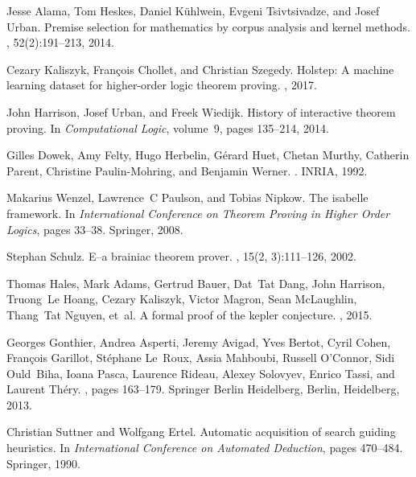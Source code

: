 \documentclass{article}
\begin{document}
\begin{thebibliography}{10}
Jesse Alama, Tom Heskes, Daniel K{\"u}hlwein, Evgeni Tsivtsivadze, and Josef
  Urban.
\newblock Premise selection for mathematics by corpus analysis and kernel
  methods.
, 52(2):191--213, 2014.

Cezary Kaliszyk, Fran{\c{c}}ois Chollet, and Christian Szegedy.
\newblock Holstep: A machine learning dataset for higher-order logic theorem
  proving.
, 2017.

John Harrison, Josef Urban, and Freek Wiedijk.
\newblock History of interactive theorem proving.
\newblock In {\em Computational Logic}, volume~9, pages 135--214, 2014.

Gilles Dowek, Amy Felty, Hugo Herbelin, G{\'e}rard Huet, Chetan Murthy,
  Catherin Parent, Christine Paulin-Mohring, and Benjamin Werner.
.
\newblock INRIA, 1992.

Makarius Wenzel, Lawrence~C Paulson, and Tobias Nipkow.
\newblock The isabelle framework.
\newblock In {\em International Conference on Theorem Proving in Higher Order
  Logics}, pages 33--38. Springer, 2008.

Stephan Schulz.
\newblock E--a brainiac theorem prover.
, 15(2, 3):111--126, 2002.

Thomas Hales, Mark Adams, Gertrud Bauer, Dat~Tat Dang, John Harrison, Truong~Le
  Hoang, Cezary Kaliszyk, Victor Magron, Sean McLaughlin, Thang~Tat Nguyen,
  et~al.
\newblock A formal proof of the kepler conjecture.
, 2015.

Georges Gonthier, Andrea Asperti, Jeremy Avigad, Yves Bertot, Cyril Cohen,
  Fran{\c{c}}ois Garillot, St{\'e}phane Le~Roux, Assia Mahboubi, Russell
  O'Connor, Sidi Ould~Biha, Ioana Pasca, Laurence Rideau, Alexey Solovyev,
  Enrico Tassi, and Laurent Th{\'e}ry.
, pages
  163--179.
\newblock Springer Berlin Heidelberg, Berlin, Heidelberg, 2013.

Christian Suttner and Wolfgang Ertel.
\newblock Automatic acquisition of search guiding heuristics.
\newblock In {\em International Conference on Automated Deduction}, pages
  470--484. Springer, 1990.


\end{thebibliography}
\end{document}
